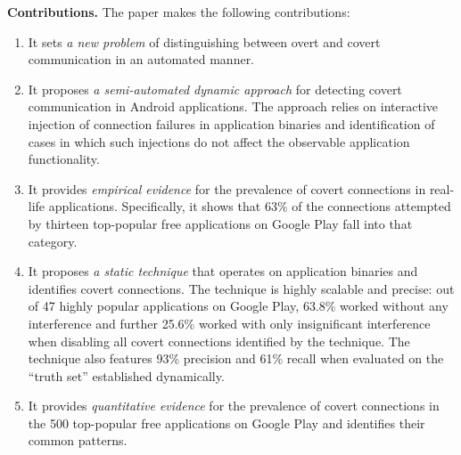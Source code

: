 
\noindent 
{\bf Contributions.}
The paper makes the following contributions:

\vspace{-0.05in}
\begin{enumerate}[leftmargin=0.5cm]\setlength{\itemsep}{-0.01in}

\item It sets \emph{a new problem} of distinguishing between overt and covert communication in an automated manner.


\item It proposes \emph{a semi-automated dynamic approach} for detecting covert communication in Android applications. 
The approach relies on interactive injection of connection failures
in application binaries and identification of cases in which such injections do not
affect the observable application functionality.

\item It provides \emph{empirical evidence} for the prevalence of covert connections in real-life applications. Specifically, it shows that 63\% of the connections attempted by thirteen top-popular free applications on Google Play fall into that category.    

\item It proposes \emph{a static technique} that operates on
application binaries and identifies covert connections. 
The
technique is highly scalable and precise: out of 47 highly popular
applications on Google Play, 63.8\% worked without any interference
and further 25.6\% worked with only insignificant interference when
disabling all covert connections identified by the technique.
The technique also features 93\% precision and 61\% recall when evaluated on the ``truth set'' established dynamically.  

\item It provides \emph{quantitative evidence} for the prevalence of covert connections in the 500 top-popular free applications on Google Play and identifies their common patterns. 


\end{enumerate}

